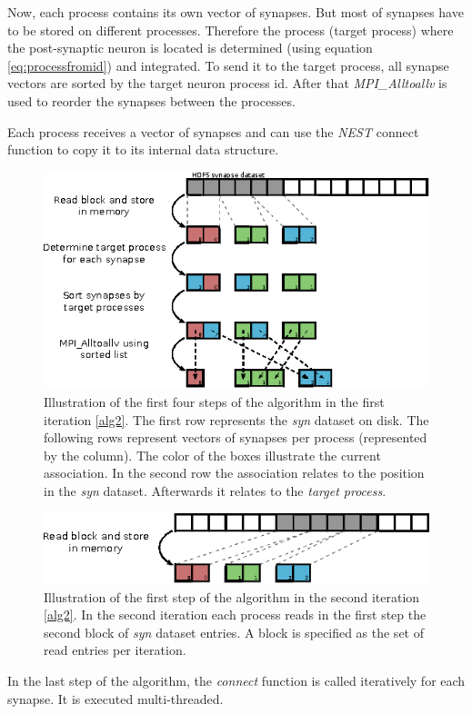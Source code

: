 Now, each process contains its own vector of synapses.
But most of synapses have to be stored on different processes.
Therefore the process (target process) where the post-synaptic neuron is located is determined (using equation \ref{eq:processfromid})
and integrated.
To send it to the target process, all synapse vectors are sorted by the target neuron process id.
After that \emph{MPI\_Alltoallv} is used to reorder the synapses between the processes.

Each process receives a vector of synapses and can use the \emph{NEST} connect function to copy it to its internal data structure.
\begin{figure}[ht!]
\centering
\includegraphics[scale=2.0]{pictures/import_syn_vis.eps}
\caption{Illustration of the first four steps of the algorithm in the first iteration \ref{alg2}.
The first row represents the \emph{syn} dataset on disk.
The following rows represent vectors of synapses per process (represented by the column).
The color of the boxes illustrate the current association.
In the second row the association relates to the position in the \emph{syn} dataset.
Afterwards it relates to the \emph{target process}.
}
\label{fig:importsynvis}
\end{figure}

\begin{figure}[ht!]
\centering
\includegraphics[scale=2.0]{pictures/import_syn_vis_second_it.eps}
\caption{Illustration of the first step of the algorithm in the second iteration \ref{alg2}.
In the second iteration each process reads in the first step the second block of \emph{syn} dataset entries.
A block is specified as the set of read entries per iteration.}
\label{fig:importsynvis2nd}
\end{figure}
\newpage
In the last step of the algorithm, the \emph{connect} function is called iteratively for each synapse.
It is executed multi-threaded.

